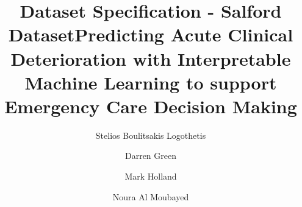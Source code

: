 \documentclass[hf]{ceurart}
\begin{document}

\title{Dataset Specification - Salford Dataset}
\title[mode=sub]{Predicting Acute Clinical Deterioration with Interpretable Machine Learning to support Emergency Care Decision Making}

\author[1]{Stelios Boulitsakis Logothetis}
\author[2,3]{Darren Green}
\author[4]{Mark Holland}
\author[1,5]{Noura Al Moubayed}
\address[1]{Department of Computer Science, University of Durham, Durham, United Kingdom}
\address[2]{Northern Care Alliance NHS Foundation Trust, Department of Renal Medicine, Manchester, United Kingdom}
\address[3]{Division of Cardiovascular Sciences, University of Manchester, Manchester, United Kingdom}
\address[4]{School of Clinical and Biomedical Sciences, University of Bolton, United Kingdom}
\address[5]{Evergreen Life Ltd, Manchester, United Kingdom}

\maketitle

\tableofcontents

\newpage
\end{document}
